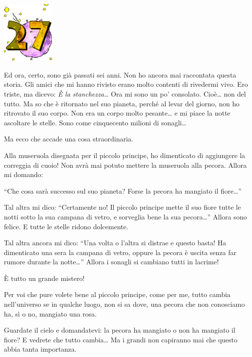 \documentclass[11pt]{scrbook}
\begin{document}
\chapter{}
\begin{center}
\includegraphics{img/chapter27}
\end{center}

Ed ora, certo, sono già passati sei anni. Non ho ancora mai raccontata questa storia. Gli amici che mi hanno rivisto erano molto contenti di rivedermi vivo. Ero triste, ma dicevo: \emph{È la stanchezza\ldots{}} Ora mi sono un po' consolato. Cioè\ldots{} non del tutto. Ma so che è ritornato nel suo pianeta, perché al levar del giorno, non ho ritrovato il suo corpo. Non era un corpo molto pesante\ldots{} e mi piace la notte ascoltare le stelle. Sono come cinquecento milioni di sonagli\ldots{}

Ma ecco che accade una cosa straordinaria.

Alla museruola disegnata per il piccolo principe, ho dimenticato di aggiungere la correggia di cuoio! Non avrà mai potuto mettere la museruola alla pecora. Allora mi domando:

``Che cosa sarà successo sul suo pianeta? Forse la pecora ha mangiato il fiore\ldots{}''

Tal altra mi dico: ``Certamente no! Il piccolo principe mette il suo fiore tutte le notti sotto la sua campana di vetro, e sorveglia bene la sua pecora\ldots{}'' Allora sono felice. E tutte le stelle ridono dolcemente.

Tal altra ancora mi dico: ``Una volta o l'altra si distrae e questo basta! Ha dimenticato una sera la campana di vetro, oppure la pecora è uscita senza far rumore durante la notte\ldots{}'' Allora i sonagli si cambiano tutti in lacrime!

È tutto un grande mistero!

Per voi che pure volete bene al piccolo principe, come per me, tutto cambia nell'universo se in qualche luogo, non si sa dove, una pecora che non conosciamo ha, sì o no, mangiato una rosa.

Guardate il cielo e domandatevi: la pecora ha mangiato o non ha mangiato il fiore? E vedrete che tutto cambia\ldots{} Ma i grandi non capiranno mai che questo abbia tanta importanza.
\end{document}
